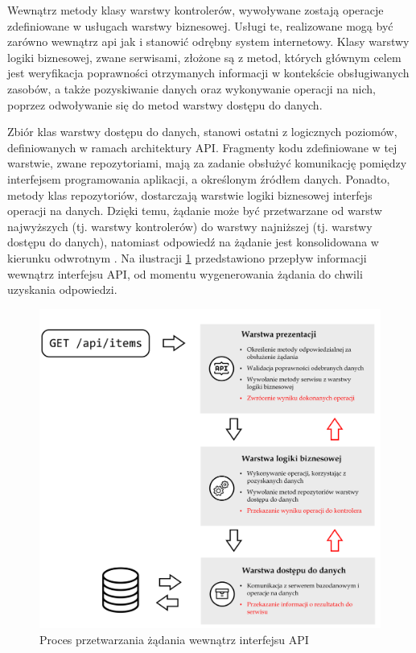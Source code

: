 Wewnątrz metody klasy warstwy kontrolerów, wywoływane zostają operacje zdefiniowane w usługach warstwy biznesowej. Usługi te, realizowane mogą być zarówno wewnątrz api jak i stanowić odrębny system internetowy. Klasy warstwy logiki biznesowej, zwane serwisami, złożone są z metod, których głównym celem jest weryfikacja poprawności otrzymanych informacji w kontekście obsługiwanych zasobów, a także pozyskiwanie danych oraz wykonywanie operacji na nich, poprzez odwoływanie się do metod warstwy dostępu do danych.

Zbiór klas warstwy dostępu do danych, stanowi ostatni z logicznych poziomów, definiowanych w ramach architektury API. Fragmenty kodu zdefiniowane w tej warstwie, zwane repozytoriami, mają za zadanie obsłużyć komunikację pomiędzy interfejsem programowania aplikacji, a określonym źródłem danych. Ponadto, metody klas repozytoriów, dostarczają warstwie logiki biznesowej interfejs operacji na danych. Dzięki temu, żądanie może być przetwarzane od warstw najwyższych (tj. warstwy kontrolerów) do warstwy najniższej (tj. warstwy dostępu do danych), natomiast odpowiedź na żądanie jest konsolidowana w kierunku odwrotnym \cite{kambalyal20103}. Na ilustracji \ref{fig:architektura-api} przedstawiono przepływ informacji wewnątrz interfejsu API, od momentu wygenerowania żądania do chwili uzyskania odpowiedzi.

\begin{figure}[ht]
 \centering
  \includegraphics[width=0.9\linewidth]{rys02/architektura-api}
 \caption{Proces przetwarzania żądania wewnątrz interfejsu API}
 \label{fig:architektura-api}
\end{figure}
 
